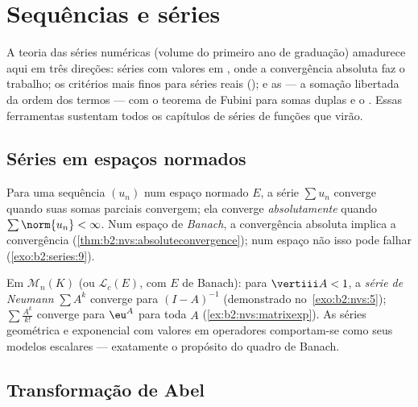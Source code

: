 \chapter{Sequências e séries}\label{ch:b2:series}

A teoria das séries numéricas (volume do primeiro ano de graduação) amadurece aqui em três
direções: séries com valores em , onde a convergência
absoluta faz o trabalho; os critérios mais finos para séries reais (); e as \emph{} --- a somação libertada
da ordem dos termos --- com o teorema de Fubini para somas duplas
e o . Essas ferramentas sustentam todos os capítulos de séries de
funções que virão.

\section{Séries em espaços normados}

\begin{definition}\label{def:b2:series:def}
Para uma sequência $(u_n)$ num espaço normado $E$, a série $\sum u_n$
converge quando suas somas parciais convergem; ela converge
\emph{absolutamente} quando
$\sum \norm{u_n} < \infty$. Num espaço de \emph{Banach}, a convergência
absoluta implica a convergência (\cref{thm:b2:nvs:absoluteconvergence});
num espaço não  isso pode falhar
(\cref{exo:b2:series:9}).
\end{definition}

\begin{example}\label{ex:b2:series:neumann}
Em $\mathcal{M}_n(K)$ (ou $\mathcal{L}_c(E)$, com $E$ de Banach): para
$\vertiii A < 1$, a \emph{série de Neumann} $\sum A^k$ converge
 para $(I - A)^{-1}$ (demonstrado no~\cref{exo:b2:nvs:5});
$\sum \frac{A^k}{k!}$ converge  para $\eu^A$ para toda $A$
(\cref{ex:b2:nvs:matrixexp}). As séries geométrica e exponencial com valores em operadores
comportam-se como seus modelos escalares --- exatamente o
propósito do quadro de Banach.
\end{example}

\section{Transformação de Abel}

